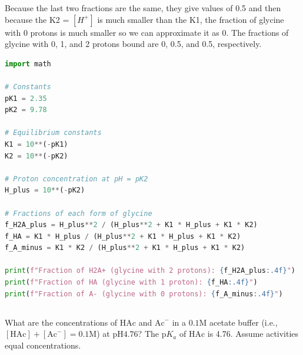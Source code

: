 \documentclass[12pt]{article}
\begin{document}
Because the last two fractions are the same, they give values of 0.5 and then because the K2 = $[H^+]$ is much smaller than the K1, the fraction of glycine with 0 protons is much smaller so we can approximate it as 0. The fractions of glycine with 0, 1, and 2 protons bound are 0, 0.5, and 0.5, respectively.
\begin{lstlisting}[language=Python]
import math

# Constants
pK1 = 2.35
pK2 = 9.78

# Equilibrium constants
K1 = 10**(-pK1)
K2 = 10**(-pK2)

# Proton concentration at pH = pK2
H_plus = 10**(-pK2)

# Fractions of each form of glycine
f_H2A_plus = H_plus**2 / (H_plus**2 + K1 * H_plus + K1 * K2)
f_HA = K1 * H_plus / (H_plus**2 + K1 * H_plus + K1 * K2)
f_A_minus = K1 * K2 / (H_plus**2 + K1 * H_plus + K1 * K2)

print(f"Fraction of H2A+ (glycine with 2 protons): {f_H2A_plus:.4f}")
print(f"Fraction of HA (glycine with 1 proton): {f_HA:.4f}")
print(f"Fraction of A- (glycine with 0 protons): {f_A_minus:.4f}")
\end{lstlisting}
\subsection{}


What are the concentrations of $\mathrm{HAc}$ and $\mathrm{Ac}^{-}$ in a $0.1 \mathrm{M}$ acetate buffer (i.e., $\left[\mathrm{HAc}\right]+\left[\mathrm{Ac}^{-}\right]=0.1 \mathrm{M}$) at $\mathrm{pH} 4.76$? The $\mathrm{p}K_a$ of $\mathrm{HAc}$ is 4.76. Assume activities equal concentrations.
\end{document}

